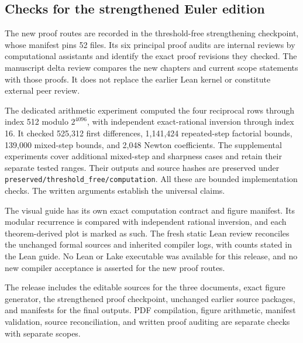 \subsection{Checks for the strengthened Euler edition}
The new proof routes are recorded in the threshold-free strengthening checkpoint, whose manifest pins 52 files. Its six principal proof audits are internal reviews by computational assistants and identify the exact proof revisions they checked. The manuscript delta review compares the new chapters and current scope statements with those proofs. It does not replace the earlier Lean kernel or constitute external peer review.

The dedicated arithmetic experiment computed the four reciprocal rows through index 512 modulo $2^{4096}$, with independent exact-rational inversion through index 16. It checked 525,312 first differences, 1,141,424 repeated-step factorial bounds, 139,000 mixed-step bounds, and 2,048 Newton coefficients. The supplemental experiments cover additional mixed-step and sharpness cases and retain their separate tested ranges. Their outputs and source hashes are preserved under \nolinkurl{preserved/threshold_free/computation}. All these are bounded implementation checks. The written arguments establish the universal claims.

The visual guide has its own exact computation contract and figure manifest. Its modular recurrence is compared with independent rational inversion, and each theorem-derived plot is marked as such. The fresh static Lean review reconciles the unchanged formal sources and inherited compiler logs, with counts stated in the Lean guide. No Lean or Lake executable was available for this release, and no new compiler acceptance is asserted for the new proof routes.

The release includes the editable sources for the three documents, exact figure generator, the strengthened proof checkpoint, unchanged earlier source packages, and manifests for the final outputs. PDF compilation, figure arithmetic, manifest validation, source reconciliation, and written proof auditing are separate checks with separate scopes.
